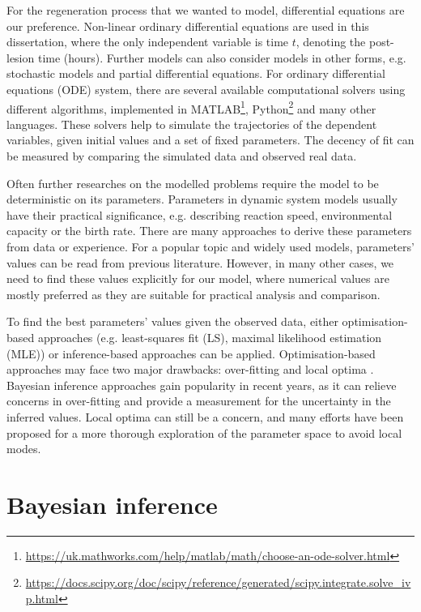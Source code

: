 For the regeneration process that we wanted to model, differential equations are our preference. Non-linear ordinary differential equations are used in this dissertation, where the only independent variable is time $t$, denoting the post-lesion time (hours). Further models can also consider models in other forms, e.g. stochastic models and partial differential equations. For ordinary differential equations (ODE) system, there are several available computational solvers using different algorithms, implemented in MATLAB\footnote[1] {\url{https://uk.mathworks.com/help/matlab/math/choose-an-ode-solver.html}}, Python\footnote[2]{\url{https://docs.scipy.org/doc/scipy/reference/generated/scipy.integrate.solve_ivp.html}} and many other languages. These solvers help to simulate the trajectories of the dependent variables, given initial values and a set of fixed parameters. The decency of fit can be measured by comparing the simulated data and observed real data.

Often further researches on the modelled problems require the model to be deterministic on its parameters. Parameters in dynamic system models usually have their practical significance, e.g. describing reaction speed, environmental capacity or the birth rate. There are many approaches to derive these parameters from data or experience. For a popular topic and widely used models, parameters' values can be read from previous literature. However, in many other cases, we need to find these values explicitly for our model, where numerical values are mostly preferred as they are suitable for practical analysis and comparison.

To find the best parameters' values given the observed data, either optimisation-based approaches (e.g. least-squares fit (LS), maximal likelihood estimation (MLE)) or inference-based approaches can be applied. Optimisation-based approaches may face two major drawbacks: over-fitting and local optima \cite{ref:abcsysbio}. Bayesian inference approaches gain popularity in recent years, as it can relieve concerns in over-fitting and provide a measurement for the uncertainty in the inferred values. Local optima can still be a concern, and many efforts have been proposed for a more thorough exploration of the parameter space to avoid local modes.



\section{Bayesian inference}

